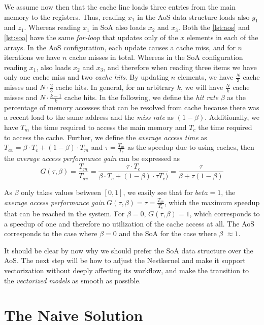 We assume now then that the cache line loads three entries from the main memory to the registers. Thus, reading $x_1$ in the AoS data structure loads also $y_1$ and $z_1$. Whereas reading $x_1$ in SoA also loads $x_2$ and $x_3$. Both the \autoref{lst:aos} and \autoref{lst:soa} have the same \emph{for-loop} that updates only of the $x$ elements in each of the arrays. In the AoS configuration, each update causes a cache miss, and for $n$ iterations we have $n$ cache misses in total. Whereas in the SoA configuration reading $x_1$, also loads $x_2$ and $x_3$, and therefore when reading three items we have only one cache miss and two \emph{cache hits}. By updating $n$ elements, we have $\frac{N}{3}$ cache misses and $N \cdot \frac{2}{3}$ cache hits. In general, for an arbitrary $k$, we will have $\frac{N}{k}$ cache misses and $N \cdot \frac{k-1}{k}$ cache hits. In the following, we define the \emph{hit rate} $\beta$ as the percentage of memory accesses that can be resolved from cache because
there was a recent load to the same address and the \emph{miss rate} as $(1 - \beta)$. Additionally, we have $T_m$ the time required to access the main memory and $T_c$ the time required to access the cache. Further, we define the \emph{average access time} as $T_{av} = \beta \cdot T_c + (1 - \beta) \cdot T_m$ and $\tau = \frac{T_m}{T_c}$ as the speedup due to using caches, then the \emph{average
access performance gain} can be expressed as $$G(\tau, \beta) = \frac{T_m}{T_{av}} = \frac{\tau \cdot T_c}{\beta \cdot T_c + (1 - \beta)\cdot \tau T_c)} = \frac{\tau}{\beta + \tau (1 - \beta)}$$


As $\beta$ only takes values between $[0, 1]$, we easily see that for $beta = 1$, the \emph{average access performance gain} $G(\tau, \beta) = \tau = \frac{T_m}{T_c}$, which the maximum speedup that can be reached in the system. For $\beta =0$, $G(\tau, \beta) = 1$, which corresponds to a speedup of one and therefore no utilization of the cache access at all. The AoS corresponds to the case where $\beta = 0$ and the SoA for the case where $\beta$ $\approx 1$.

It should be clear by now why we should prefer the SoA data structure over  the AoS. The next step will be how to adjust the Nestkernel and make it support vectorization without deeply affecting its workflow, and make the transition to the \emph{vectorized models} as smooth as possible.

\section{The Naive Solution}

